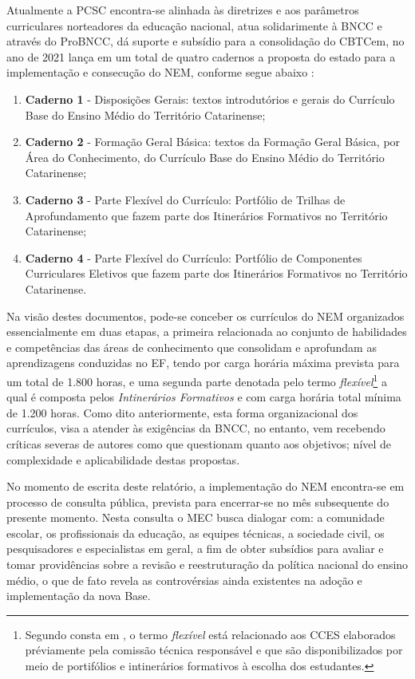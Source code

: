 Atualmente a \ac{PCSC} encontra-se alinhada às diretrizes e aos parâmetros curriculares norteadores da educação nacional, atua solidarimente à \ac{BNCC} e  através do \ac{ProBNCC}, dá suporte e subsídio para a consolidação do \ac{CBTCem}, no ano de 2021 lança em um total de quatro cadernos a proposta do estado para a implementação e consecução do \ac{NEM}, conforme segue abaixo \cite{CATARINA:2021}:

\begin{enumerate}[label=\Roman *)]
	\item \textbf{Caderno 1} - Disposições Gerais: textos introdutórios e gerais do Currículo Base do Ensino Médio do Território Catarinense;
	\item \textbf{Caderno 2} - Formação Geral Básica: textos da Formação Geral Básica, por Área do Conhecimento, do Currículo Base do Ensino Médio do Território Catarinense;
	\item \textbf{Caderno 3} - Parte Flexível do Currículo: Portfólio de Trilhas de Aprofundamento que fazem parte dos Itinerários Formativos no Território Catarinense;
	\item \textbf{Caderno 4} - Parte Flexível do Currículo: Portfólio de Componentes Curriculares Eletivos que fazem parte dos Itinerários Formativos no Território Catarinense.
\end{enumerate}

Na visão destes documentos, pode-se conceber os currículos do \ac{NEM} organizados essencialmente em duas etapas, a primeira relacionada ao conjunto de habilidades e competências das áreas de conhecimento que consolidam e aprofundam as aprendizagens conduzidas no \ac{EF}, tendo por carga horária máxima prevista para um total de 1.800 horas, e uma segunda parte denotada pelo termo \textit{flexível}\footnote{Segundo consta em \cite{CATARINA:2021d}, o termo \textit{flexível} está relacionado aos \ac{CCES} elaborados préviamente pela comissão técnica responsável e que são disponibilizados por meio de portifólios e intinerários formativos à escolha dos estudantes.} a qual é composta pelos \textit{Intinerários Formativos} e com carga horária total mínima de 1.200 horas. Como dito anteriormente, esta forma organizacional dos currículos, visa a atender às exigências da \ac{BNCC}, no entanto, vem recebendo críticas severas de autores como \cite{OSTERMANN:2021,ERICK:2020} que questionam quanto aos objetivos; nível de complexidade e aplicabilidade destas propostas.

No momento de escrita deste relatório, a implementação do \ac{NEM} encontra-se em processo de consulta pública, prevista para encerrar-se no mês subsequente do presente momento. Nesta consulta o \ac{MEC} busca dialogar com: a comunidade escolar, os profissionais da educação, as equipes técnicas, a sociedade civil, os pesquisadores e especialistas em geral, a fim de obter subsídios para avaliar e tomar providências sobre a revisão e reestruturação da política nacional do ensino médio, o que de fato revela as controvérsias ainda existentes na adoção e implementação da nova Base.

